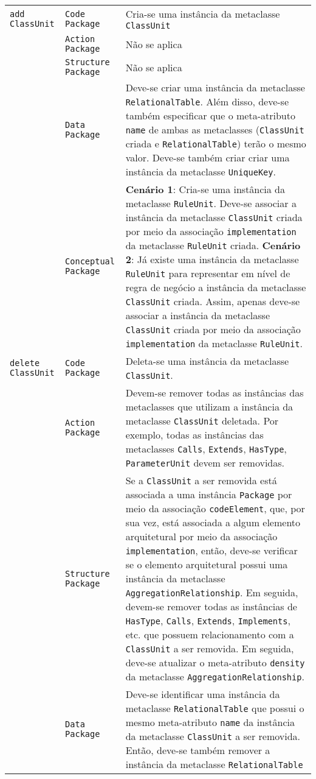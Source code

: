 \begin{longtable}{ | m{1.9cm} | m{3.57cm}| m{9.3cm} | }
 \texttt{add} \texttt{ClassUnit} & \texttt{Code Package} & Cria-se uma instância da metaclasse \texttt{ClassUnit}\tabularnewline
\cline{2-3} 
\cline{2-3} 
 & \texttt{Action Package} & Não se aplica \tabularnewline
 \cline{2-3} 
 & \texttt{Structure Package} & Não se aplica \tabularnewline
\cline{2-3} 
 & \texttt{Data Package} & Deve-se criar uma instância da metaclasse \texttt{RelationalTable}. Além disso, deve-se também especificar que o meta-atributo \texttt{name} de ambas as metaclasses (\texttt{ClassUnit} criada e \texttt{RelationalTable}) terão o mesmo valor. Deve-se também criar criar uma instância da metaclasse \texttt{UniqueKey}. \tabularnewline
\cline{2-3} 
 & \texttt{Conceptual Package} & \textbf{Cenário 1}: Cria-se uma instância da metaclasse \texttt{RuleUnit}. Deve-se associar a instância da metaclasse \texttt{ClassUnit} criada por meio da associação \texttt{implementation} da metaclasse \texttt{RuleUnit} criada. \textbf{Cenário 2}: Já existe uma instância da metaclasse \texttt{RuleUnit} para representar em nível de regra de negócio a instância da metaclasse \texttt{ClassUnit} criada. Assim, apenas deve-se associar a instância da metaclasse \texttt{ClassUnit} criada por meio da associação \texttt{implementation} da metaclasse \texttt{RuleUnit}. \tabularnewline
\hline 
 \texttt{delete} \texttt{ClassUnit} & \texttt{Code Package} & Deleta-se uma instância da metaclasse \texttt{ClassUnit}.\tabularnewline
\cline{2-3} 
& \texttt{Action Package} & Devem-se remover todas as instâncias das metaclasses que utilizam a instância da metaclasse \texttt{ClassUnit} deletada. Por exemplo, todas as instâncias das metaclasses \texttt{Calls}, \texttt{Extends}, \texttt{HasType}, \texttt{ParameterUnit} devem ser removidas. \tabularnewline
\cline{2-3}
& \texttt{Structure Package} & Se a \texttt{ClassUnit} a ser removida está associada a uma instância \texttt{Package} por meio da associação \texttt{codeElement}, que, por sua vez, está associada a algum elemento arquitetural por meio da associação \texttt{implementation}, então, deve-se verificar se o elemento arquitetural possui uma instância da metaclasse \texttt{AggregationRelationship}. Em seguida, devem-se remover todas as instâncias de \texttt{HasType}, \texttt{Calls}, \texttt{Extends}, \texttt{Implements}, etc. que possuem relacionamento com a \texttt{ClassUnit} a ser removida. Em seguida, deve-se atualizar o meta-atributo \texttt{density} da metaclasse \texttt{AggregationRelationship}. \tabularnewline
\cline{2-3}
& \texttt{Data Package} & Deve-se identificar uma instância da metaclasse \texttt{RelationalTable} que possui o mesmo meta-atributo \texttt{name} da instância da metaclasse \texttt{ClassUnit} a ser removida. Então, deve-se também remover a instância da metaclasse \texttt{RelationalTable} \tabularnewline

\end{longtable}
